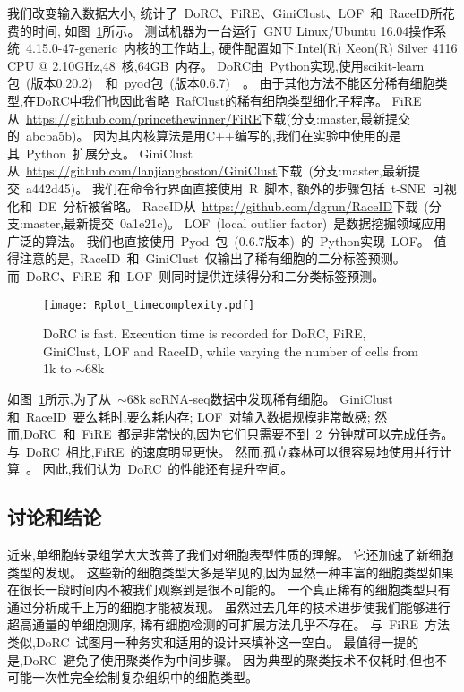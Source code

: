 我们改变输入数据大小,
统计了~DoRC、FiRE、GiniClust、LOF~\cite{breunig2000lof}和~RaceID所花费的时间,
如图~\ref{fig:timecomplexity}所示。
测试机器为一台运行~GNU Linux/Ubuntu 16.04操作系统~4.15.0-47-generic~内核的工作站上,
硬件配置如下:Intel(R) Xeon(R) Silver 4116 CPU @ 2.10GHz,48~核,64GB~内存。
DoRC由~Python实现,使用scikit-learn包~(版本0.20.2)~~\cite{pedregosa2011scikit}和~pyod包~(版本0.6.7)~~\cite{zhao2019pyod}。
由于其他方法不能区分稀有细胞类型,在DoRC中我们也因此省略~RafClust的稀有细胞类型细化子程序。
FiRE从~\url{https://github.com/princethewinner/FiRE}下载(分支:master,最新提交的~abcba5b)。
因为其内核算法是用C++编写的,我们在实验中使用的是其~Python~扩展分支。
GiniClust从~\url{https://github.com/lanjiangboston/GiniClust}下载~(分支:master,最新提交~a442d45)。
我们在命令行界面直接使用~R~脚本,
额外的步骤包括~t-SNE~可视化和~DE~分析被省略。
RaceID从~\url{https://github.com/dgrun/RaceID}下载~(分支:master,最新提交~0a1e21c)。
LOF~(local outlier factor)~是数据挖掘领域应用广泛的算法。
我们也直接使用~Pyod~包~(0.6.7版本)~\cite{zhao2019pyod}的~Python实现~LOF。
值得注意的是,~RaceID~和~GiniClust~仅输出了稀有细胞的二分标签预测。
而~DoRC、FiRE~和~LOF~则同时提供连续得分和二分类标签预测。
\begin{figure}[!htbp]
    \centering
    \texttt{[image: Rplot\_timecomplexity.pdf]}
    \caption{DoRC is fast. Execution time is recorded for DoRC, FiRE, GiniClust, LOF and RaceID, while varying the number of cells from 1k
    to ${\sim} 68$k}
    \label{fig:timecomplexity}
\end{figure}

如图~\ref{fig:timecomplexity}所示,为了从~${\sim}68$k scRNA-seq数据中发现稀有细胞。 
GiniClust和~RaceID~要么耗时,要么耗内存;
LOF~对输入数据规模非常敏感;
然而,DoRC~和~FiRE~都是非常快的,因为它们只需要不到~2~分钟就可以完成任务。
与~DoRC~相比,FiRE~的速度明显更快。
然而,孤立森林可以很容易地使用并行计算~\cite{hariri2018batch}。
因此,我们认为~DoRC~的性能还有提升空间。

\subsection{讨论和结论}
近来,单细胞转录组学大大改善了我们对细胞表型性质的理解。
它还加速了新细胞类型的发现。
这些新的细胞类型大多是罕见的,因为显然一种丰富的细胞类型如果在很长一段时间内不被我们观察到是很不可能的。
一个真正稀有的细胞类型只有通过分析成千上万的细胞才能被发现。
虽然过去几年的技术进步使我们能够进行超高通量的单细胞测序,
稀有细胞检测的可扩展方法几乎不存在。
与~FiRE~方法类似,DoRC~试图用一种务实和适用的设计来填补这一空白。
最值得一提的是,DoRC~避免了使用聚类作为中间步骤。
因为典型的聚类技术不仅耗时,但也不可能一次性完全绘制复杂组织中的细胞类型。

